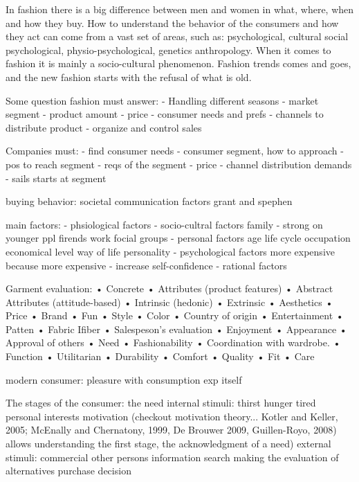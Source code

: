 In fashion there is a big difference between men and women in what, where, when and how they buy.
How to understand the behavior of the consumers and how they act can come from a vast set of areas, such as: psychological, cultural social psychological, physio-psychological, genetics anthropology.
When it comes to fashion it is mainly a socio-cultural phenomenon. %
Fashion trends comes and goes, and the new fashion starts with the refusal of what is old.

Some question fashion must answer:
    - Handling different seasons
    - market segment
    - product amount
    - price
    - consumer needs and prefs
    - channels to distribute product
    - organize and control sales

Companies must:
- find consumer needs
- consumer segment, how to approach
- pos to reach segment
- reqs of the segment
- price
- channel distribution demands
- sails starts at segment

buying behavior:
societal communication factors grant and spephen

main factors:
- phsiological factors
- socio-cultral factors
    family - strong on younger ppl
    firends
    work
    focial groups
- personal factors
    age
    life cycle
    occupation
    economical level
    way of life
    personality
- psychological factors
    more expensive because more expensive - increase self-confidence
- rational factors

Garment evaluation:
• Concrete
• Attributes (product features)
• Abstract Attributes (attitude-based)
• Intrinsic (hedonic)
• Extrinsic
• Aesthetics
• Price
• Brand
• Fun
• Style
• Color
• Country of origin
• Entertainment
• Patten
• Fabric Ifiber
• Salespeson's evaluation
• Enjoyment
• Appearance
• Approval of others
• Need
• Fashionability
• Coordination with wardrobe.
• Function
• Utilitarian
• Durability
• Comfort
• Quality
• Fit
• Care

modern consumer: pleasure with consumption exp itself

The stages of the consumer:
	the need
		internal stimuli:
			thirst
			hunger
			tired
			personal interests
			motivation (checkout motivation theory... Kotler and Keller, 2005; McEnally and Chernatony, 1999, De Brouwer 2009, Guillen-Royo, 2008) allows understanding the first stage, the acknowledgment of a need)
		external stimuli:
			commercial
			other persons
	information search
	making the evaluation of alternatives
	purchase decision

